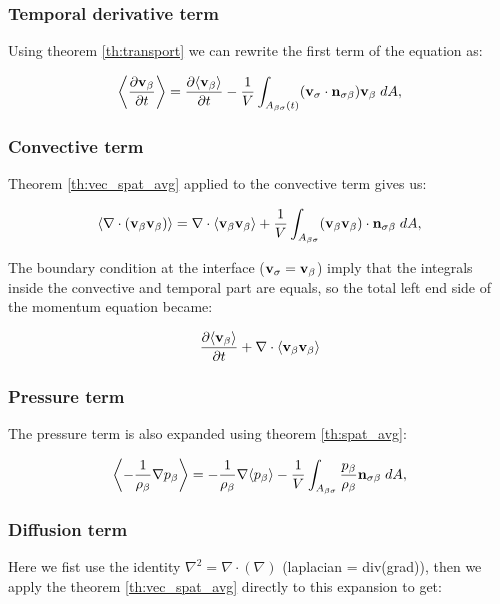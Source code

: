 \subsubsection{Temporal derivative term}
Using theorem \eqref{th:transport} we can rewrite the first term of the equation as:

\begin{equation}
{\left< \dfrac{\partial \textbf{v}_{\beta}}{\partial t} \right>} = \dfrac{\partial {\left< \textbf{v}_{\beta}\right>}}{\partial t} -\dfrac{1}{V} \int_{A_{\beta \sigma}(t)} (\textbf{v}_{\sigma} \cdot \mathbf{n}_{\sigma \beta} ) \textbf{v}_{\beta} \;dA,
\end{equation}

\subsubsection{Convective term}
Theorem \eqref{th:vec_spat_avg} applied to the convective term gives us:

\begin{equation}
{\left< \nabla \cdot (\textbf{v}_{\beta}\textbf{v}_{\beta}) \right>} = \nabla \cdot {\left< \textbf{v}_{\beta}\textbf{v}_{\beta}\right>} + \dfrac{1}{V} \int_{A_{\beta \sigma}}  (\textbf{v}_{\beta} \textbf{v}_{\beta}) \cdot \mathbf{n}_{\sigma \beta} \;dA,
\end{equation}

The boundary condition at the interface ($\textbf{v}_{\sigma} = \textbf{v}_{\beta}$) imply that the integrals inside the convective and temporal part are equals, so the total left end side of the momentum equation became:

\begin{equation}
\dfrac{\partial {\left< \textbf{v}_{\beta}\right>}}{\partial t} + \nabla \cdot {\left< \textbf{v}_{\beta}\textbf{v}_{\beta}\right>}
\label{eq:lhs}
\end{equation}

\subsubsection{Pressure term}
The pressure term is also expanded using theorem \ref{th:spat_avg}:

\begin{equation}
{\left< -\dfrac{1}{\rho_{\beta}} \nabla p_{\beta}\right>} = -\dfrac{1}{\rho_{\beta}} \nabla {\left< p_{\beta}\right>} -\dfrac{1}{V} \int_{A_{\beta \sigma}} \dfrac{p_{\beta}}{\rho_{\beta}} \mathbf{n}_{\sigma \beta} \;dA,
\end{equation}

\subsubsection{Diffusion term}
Here we fist use the identity $\nabla^2 = \nabla \cdot (\nabla)$ (laplacian = div(grad)), then we apply the theorem \ref{th:vec_spat_avg} directly to this expansion to get:

